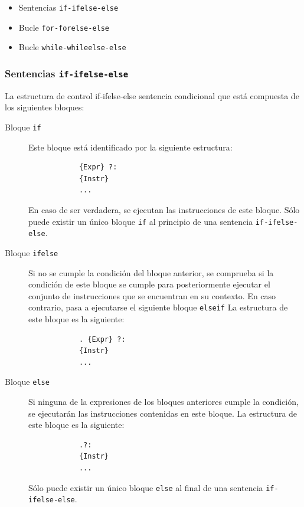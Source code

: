 \documentclass[11pt, english]{article}
\begin{document}
	\begin{itemize}
		\item Sentencias \texttt{if-ifelse-else}
		\item Bucle \texttt{for-forelse-else}
		\item Bucle \texttt{while-whileelse-else}
	\end{itemize}
	
	\subsubsection{Sentencias \texttt{if-ifelse-else}}
	La estructura de control if-ifelse-else sentencia condicional que está compuesta de los siguientes bloques:
	\begin{description}
		\item[Bloque \texttt{if}] Este bloque está identificado por la siguiente estructura:
		\begin{center}
			\begin{lstlisting}
			{Expr} ?:
			{Instr}
			...
			\end{lstlisting}
		\end{center}
		En caso de ser verdadera, se ejecutan las instrucciones de este bloque. Sólo puede existir un único bloque \texttt{if} al principio de una sentencia \texttt{if-ifelse-else}.
		\item[Bloque \texttt{ifelse}] Si no se cumple la condición del bloque anterior, se comprueba si la condición de este bloque se cumple para posteriormente ejecutar el conjunto de instrucciones que se encuentran en su contexto. En caso contrario, pasa a ejecutarse el siguiente bloque \texttt{elseif} La estructura de este bloque es la siguiente:
		\begin{center}
			\begin{lstlisting}
			. {Expr} ?:
			{Instr}
			...
			\end{lstlisting}
		\end{center}
		\item[Bloque \texttt{else}] Si ninguna de la expresiones de los bloques anteriores cumple la condición, se ejecutarán las instrucciones contenidas en este bloque. La estructura de este bloque es la siguiente:
		\begin{center}
			\begin{lstlisting}
			.?:
			{Instr}
			...
			\end{lstlisting}
		\end{center}
		Sólo puede existir un único bloque \texttt{else} al final de una sentencia \texttt{if-ifelse-else}.
	\end{description}
	
\end{document}
